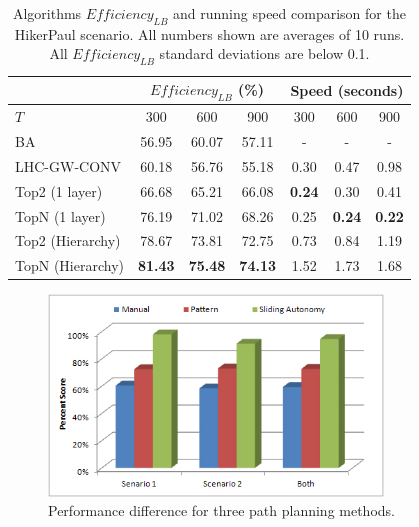 \documentclass[journal]{IEEEtran}
\begin{document}
\begin{table}
\caption{Algorithms $\mathit{Efficiency_{LB}}$ and running speed comparison for the HikerPaul scenario. All numbers shown are averages of 10 runs. All $\mathit{Efficiency_{LB}}$ standard deviations are below 0.1.}
	\centering
		\begin{tabular}
			{|l|c|c|c|c|c|c|}
			\hline
			 & \multicolumn{3}{|c|}{$\mathit{Efficiency_{LB}}$ (\%)} & \multicolumn{3}{|c|}{Speed (seconds)} \\
			\hline
			$T$ & 300 & 600 & 900	& 300 & 600 & 900 \\
			\hline
			BA & 56.95 & 60.07 & 57.11 & - & - & - \\
			\hline			
			LHC-GW-CONV & 60.18 & 56.76 & 55.18 & 0.30 & 0.47 & 0.98 \\
			\hline			
			Top2 (1 layer)	& 66.68 & 65.21 & 66.08 & \textbf{0.24} & 0.30 & 0.41 \\ 
			\hline
			TopN (1 layer)	& 76.19 & 71.02 & 68.26 & 0.25 & \textbf{0.24} & \textbf{0.22} \\ 
			\hline
			Top2 (Hierarchy) & 78.67 & 73.81 & 72.75 & 0.73 & 0.84 & 1.19 \\ 
			\hline
			TopN (Hierarchy) & \textbf{81.43} & \textbf{75.48} & \textbf{74.13} & 1.52 & 1.73 & 1.68 \\ 
			\hline			
		\end{tabular}
\label{HikerPaul}
\end{table}

\begin{figure}
\centering
\includegraphics[width=3.5in]{PerformanceDifference.JPG}
\caption{Performance difference for three path planning methods.}
\label{PerformanceDifference}
\end{figure}
\end{document}

